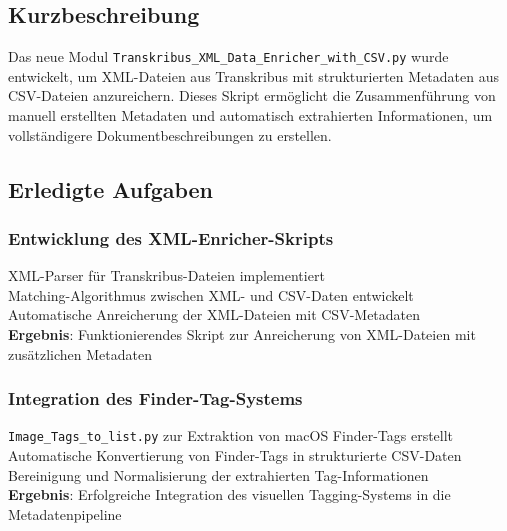 \documentclass{article}
\begin{document}
\subsection*{Kurzbeschreibung}

Das neue Modul \texttt{Transkribus\_XML\_Data\_Enricher\_with\_CSV.py} wurde entwickelt, um XML-Dateien aus Transkribus mit strukturierten Metadaten aus CSV-Dateien anzureichern. Dieses Skript ermöglicht die Zusammenführung von manuell erstellten Metadaten und automatisch extrahierten Informationen, um vollständigere Dokumentbeschreibungen zu erstellen.

\subsection*{Erledigte Aufgaben}
\subsubsection*{\small Entwicklung des XML-Enricher-Skripts}
 XML-Parser für Transkribus-Dateien implementiert\\
 Matching-Algorithmus zwischen XML- und CSV-Daten entwickelt\\
 Automatische Anreicherung der XML-Dateien mit CSV-Metadaten\\
\textbf{Ergebnis}: Funktionierendes Skript zur Anreicherung von XML-Dateien mit zusätzlichen Metadaten

\subsubsection*{\small Integration des Finder-Tag-Systems}
 \texttt{Image\_Tags\_to\_list.py} zur Extraktion von macOS Finder-Tags erstellt\\
 Automatische Konvertierung von Finder-Tags in strukturierte CSV-Daten\\
 Bereinigung und Normalisierung der extrahierten Tag-Informationen\\
\textbf{Ergebnis}: Erfolgreiche Integration des visuellen Tagging-Systems in die Metadatenpipeline
\end{document}
